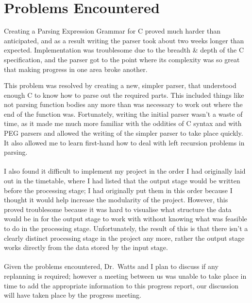 \documentclass[10pt,oneside,a4paper]{article}
\begin{document}
\section*{Problems Encountered}
Creating a Parsing Expression Grammar for C proved much harder than anticipated,
and as a result writing the parser took about two weeks longer than expected.
Implementation was troublesome due to the breadth \& depth of the C
specification, and the parser got to the point where its complexity was so great
that making progress in one area broke another.

This problem was resolved by creating a new, simpler parser, that understood
enough C to know how to parse out the required parts. This included things like
not parsing function bodies any more than was necessary to work out where the
end of the function was. Fortunately, writing the initial parser wasn't a waste
of time, as it made me much more familiar with the oddities of C syntax and with
PEG parsers and allowed the writing of the simpler parser to take place quickly.
It also allowed me to learn first-hand how to deal with left recursion problems
in parsing.
\\
\\
I also found it difficult to implement my project in the order I had originally
laid out in the timetable, where I had listed that the output stage would be
written before the processing stage; I had originally put them in this order
because I thought it would help increase the modularity of the project. However,
this proved troublesome because it was hard to visualise what structure the data
would be in for the output stage to work with without knowing what was feasible
to do in the processing stage. Unfortunately, the result of this is that there
isn't a clearly distinct processing stage in the project any more, rather the
output stage works directly from the data stored by the input stage.
\\
\\
Given the problems encountered, Dr.~Watts and I plan to discuss if any
replanning is required; however a meeting between us was unable to take place
in time to add the appropriate information to this progress report, our
discussion will have taken place by the progress meeting.
\end{document}
